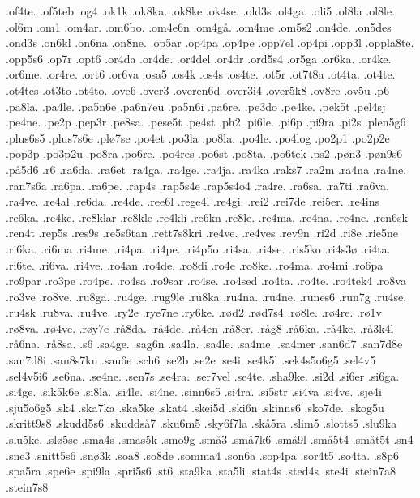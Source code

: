 .of4te.
.of5teb
.og4
.ok1k
.ok8ka.
.ok8ke
.ok4se.
.old3s
.ol4ga.
.oli5
.ol8la
.ol8le.
.ol6m
.om1
.om4ar.
.om6bo.
.om4e6n
.om4g^^e5.
.om4me
.om5s2
.on4de.
.on5des
.ond3s
.on6kl
.on6na
.on8ne.
.op5ar
.op4pa
.op4pe
.opp7el
.op4pi
.opp3l
.oppla8te.
.opp5s6
.op7r
.opt6
.or4da
.or4de.
.or4del
.or4dr
.ord5s4
.or5ga
.or6ka.
.or4ke.
.or6me.
.or4re.
.ort6
.or6va
.osa5
.os4k
.os4s
.os4te.
.ot5r
.ot7t8a
.ot4ta.
.ot4te.
.ot4tes
.ot3to
.ot4to.
.ove6
.over3
.overen6d
.over3i4
.over5k8
.ov8re
.ov5u
.p6
.pa8la.
.pa4le.
.pa5n6e
.pa6n7eu
.pa5n6i
.pa6re.
.pe3do
.pe4ke.
.pek5t
.pel4sj
.pe4ne.
.pe2p
.pep3r
.pe8sa.
.pese5t
.pe4st
.ph2
.pi6le.
.pi6p
.pi9ra
.pi2s
.plen5g6
.plus6s5 
.plus7s6e
.pl^^f87se
.po4et
.po3la
.po8la.
.po4le.
.po4log
.po2p1
.po2p2e
.pop3p
.po3p2u
.po8ra
.po6re.
.po4res
.po6st
.po8ta.
.po6tek
.ps2
.p^^f8n3
.p^^f8n9s6
.p^^e55d6
.r6
.ra6da.
.ra6et
.ra4ga.
.ra4ge.
.ra4ja.
.ra4ka
.raks7
.ra2m
.ra4na
.ra4ne.
.ran7s6a
.ra6pa.
.ra6pe.
.rap4s
.rap5s4e
.rap5s4o4
.ra4re.
.ra6sa.
.ra7ti
.ra6va.
.ra4ve.
.re4al
.re6da.
.re4de.
.ree6l
.rege4l
.re4gi.
.rei2
.rei7de
.rei5er.
.re4ins
.re6ka.
.re4ke.
.re8klar
.re8kle
.re4kli
.re6kn
.re8le.
.re4ma.
.re4na.
.re4ne.
.ren6sk
.ren4t
.rep5s
.res9s
.re5s6tan
.rett7s8kri
.re4ve.
.re4ves
.rev9n
.ri2d
.ri8e
.rie5ne
.ri6ka.
.ri6ma
.ri4me.
.ri4pa.
.ri4pe.
.ri4p5o
.ri4sa.
.ri4se.
.ris5ko
.ri4s3^^f8
.ri4ta.
.ri6te.
.ri6va.
.ri4ve.
.ro4an
.ro4de.
.ro8di
.ro4e
.ro8ke.
.ro4ma.
.ro4mi
.ro6pa
.ro9par
.ro3pe
.ro4pe.
.ro4sa
.ro9sar
.ro4se.
.ro4sed
.ro4ta.
.ro4te.
.ro4tek4
.ro8va
.ro3ve
.ro8ve.
.ru8ga.
.ru4ge.
.rug9le
.ru8ka
.ru4na.
.ru4ne.
.runes6
.run7g
.ru4se.
.ru4sk
.ru8va.
.ru4ve.
.ry2e
.rye7ne
.ry6ke.
.r^^f8d2
.r^^f8d7s4
.r^^f88le.
.r^^f84re.
.r^^f81v
.r^^f88va.
.r^^f84ve.
.r^^f8y7e
.r^^e58da.
.r^^e54de.
.r^^e54en
.r^^e58er.
.r^^e5g8
.r^^e56ka.
.r^^e54ke.
.r^^e53k4l
.r^^e56na.
.r^^e58sa.
.s6
.sa4ge.
.sag6n
.sa4la.
.sa4le.
.sa4me.
.sa4mer
.san6d7
.san7d8e
.san7d8i
.san8s7ku
.sau6e
.sch6
.se2b
.se2e
.se4i
.se4k5l
.sek4s5o6g5
.sel4v5
.sel4v5i6
.se6na.
.se4ne.
.sen7s
.se4ra.
.ser7vel
.se4te.
.sha9ke.
.si2d
.si6er
.si6ga.
.si4ge.
.sik5k6e
.si8la.
.si4le.
.si4ne.
.sinn6s5
.si4ra.
.si5str
.si4va
.si4ve.
.sje4i
.sju5o6g5
.sk4
.ska7ka
.ska5ke
.skat4
.skei5d
.ski6n
.skinns6
.sko7de.
.skog5u
.skritt9s8
.skudd5s6
.skudds^^e57
.sku6m5
.sky6f7la
.sk^^e55ra
.slim5
.slotts5
.slu9ka
.slu5ke.
.sl^^f85se
.sma4s
.smas5k
.smo9g
.sm^^e53
.sm^^e57k6
.sm^^e59l
.sm^^e55t4
.sm^^e5t5t
.sn4
.sne3
.snitt5s6
.sn^^f83k
.soa8
.so8de
.somma4
.son6a
.sop4pa
.sor4t5
.so4ta.
.s8p6
.spa5ra
.spe6e
.spi9la
.spri5s6
.st6
.sta9ka
.sta5li
.stat4s
.sted4s
.ste4i
.stein7a8
.stein7s8
